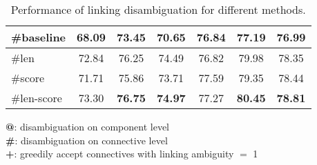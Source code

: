 \begin{table}[ht]
\begin{tabular}{|l|c|c|c|c|c|c|}
\hhline{|=|=|=|=|=|=|=|}

   \#baseline               &     68.09     &     73.45  &     70.65     &     76.84     &     77.19  &     76.99    \\ \hline
   \#len                    &     72.84     &     76.25  &     74.49     &     76.82     &     79.98  &     78.35    \\ \hline
   \#score                  &     71.71     &     75.86  &     73.71     &     77.59     &     79.35  &     78.44    \\ \hline
   \#len-score              &     73.30     & \bf 76.75  & \bf 74.97     &     77.27     & \bf 80.45  & \bf 78.81    \\ \hline

\end{tabular}
\begin{flushleft}
\small
\textbf{@}: disambiguation on component level \\
\textbf{\#}: disambiguation on connective level \\
\textbf{+}: greedily accept connectives with linking ambiguity $=$ 1
\end{flushleft}
\caption{\label{t:linking-methods} Performance of linking
disambiguation for different methods. }
\end{table}

